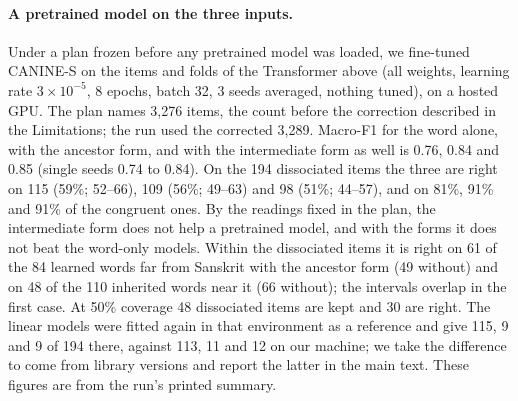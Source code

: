 \documentclass[11pt]{article}
\begin{document}
\paragraph{A pretrained model on the three inputs.} Under a plan frozen before any pretrained model was loaded, we fine-tuned CANINE-S \citep{clark2022canine} on the items and folds of the Transformer above (all weights, learning rate $3\times10^{-5}$, 8 epochs, batch 32, 3 seeds averaged, nothing tuned), on a hosted GPU. The plan names 3,276 items, the count before the correction described in the Limitations; the run used the corrected 3,289. Macro-F1 for the word alone, with the ancestor form, and with the intermediate form as well is 0.76, 0.84 and 0.85 (single seeds 0.74 to 0.84). On the 194 dissociated items the three are right on 115 (59\%; 52--66), 109 (56\%; 49--63) and 98 (51\%; 44--57), and on 81\%, 91\% and 91\% of the congruent ones. By the readings fixed in the plan, the intermediate form does not help a pretrained model, and with the forms it does not beat the word-only models. Within the dissociated items it is right on 61 of the 84 learned words far from Sanskrit with the ancestor form (49 without) and on 48 of the 110 inherited words near it (66 without); the intervals overlap in the first case. At 50\% coverage 48 dissociated items are kept and 30 are right. The linear models were fitted again in that environment as a reference and give 115, 9 and 9 of 194 there, against 113, 11 and 12 on our machine; we take the difference to come from library versions and report the latter in the main text. These figures are from the run's printed summary.
\end{document}
